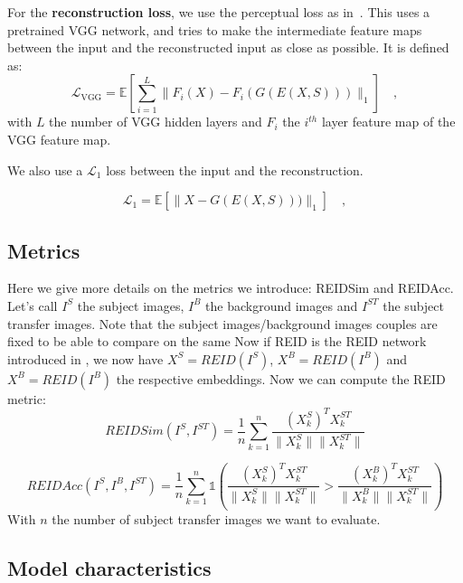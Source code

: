 \documentclass[runningheads]{llncs}
\begin{document}
\noindent For the \textbf{reconstruction loss}, we use the perceptual loss as in~\cite{Zhu_2020}. This uses a pretrained VGG network, and tries to make the intermediate feature maps between the input and the reconstructed input as close as possible. It is defined as:
\begin{equation}
     \mathcal{L}_{\text{VGG}} = \mathbb{E}\left[\sum_{i=1}^L\lVert F_i(X) - F_i(G(E(X,S))) \rVert_1 \right] \quad ,
\end{equation}
\noindent with $L$ the number of VGG hidden layers and $F_i$ the $i^{th}$ layer feature map of the VGG feature map.


We also use a $\mathcal{L}_1$ loss between the input and the reconstruction.

\begin{equation}
     \mathcal{L}_1 = \mathbb{E}\left[\lVert X -G(E(X,S)))  \rVert_1 \right] \quad ,
\end{equation}
\subsection{Metrics}
Here we give more details on the metrics we introduce: REIDSim and REIDAcc. Let's call $I^S$ the subject images, $I^B$ the background images and $I^{ST}$ the subject transfer images. Note that the subject images/background images couples are fixed to be able to compare on the same 
Now if REID is the REID network introduced in \cite{fu2021unsupervised}, we now have $X^S = REID(I^S)$, $X^B = REID(I^B)$ and $X^B = REID(I^B)$ the respective embeddings. Now we can compute the REID metric:
\begin{equation}
    REIDSim(I^S, I^{ST}) = \frac{1}{n}\sum_{k=1}^n \frac{(X^S_k)^TX^{ST}_k}{\lVert X^S_k\rVert\lVert X^{ST}_k\rVert}
\end{equation}

\begin{equation}
    REIDAcc(I^S, I^B, I^{ST}) = \frac{1}{n}\sum_{k=1}^n \mathbb{1}\left( \frac{(X^S_k)^TX^{ST}_k}{\lVert X^S_k\rVert\lVert X^{ST}_k\rVert}>\frac{(X^B_k)^TX^{ST}_k}{\lVert X^B_k\rVert\lVert X^{ST}_k\rVert} \right)
\end{equation}
With $n$ the number of subject transfer images we want to evaluate.

\subsection{Model characteristics} 
\end{document}
